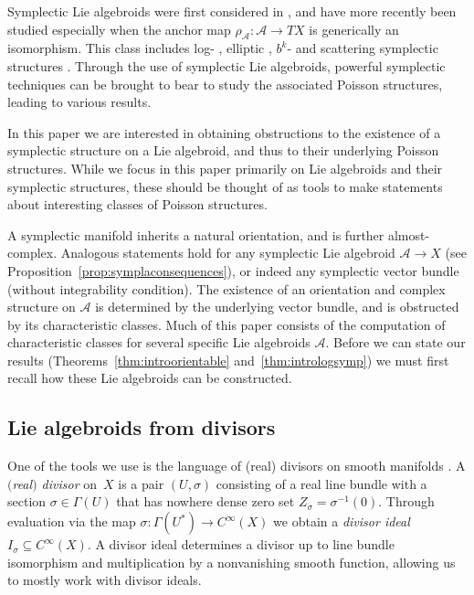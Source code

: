 \documentclass[pdftex]{sigma}
\numberwithin{equation}{section}
\begin{document}
Symplectic Lie algebroids were first considered in \cite{NestTsygan01}, and have more recently been studied especially when the anchor map $\rho_\mathcal{A}\colon \mathcal{A} \to TX$ is generically an isomorphism. This class includes log- \cite{Cavalcanti17,GualtieriLi14,GuilleminMirandaPires14,MarcutOsornoTorres14,MarcutOsornoTorres14two}, elliptic \cite{CavalcantiGualtieri18, CavalcantiKlaasse18}, $b^k$- \cite{GuilleminMirandaWeitsman17, MirandaPlanas18two, MirandaPlanas18, Scott16} and scattering symplectic structures \cite{Lanius16}. Through the use of symplectic Lie algebroids, powerful symplectic techniques can be brought to bear to study the associated Poisson structures, leading to various results.

In this paper we are interested in obtaining obstructions to the existence of a symplectic structure on a Lie algebroid, and thus to their underlying Poisson structures. While we focus in this paper primarily on Lie algebroids and their symplectic structures, these should be thought of as tools to make statements about interesting classes of Poisson structures.

A symplectic manifold inherits a natural orientation, and is further almost-complex. Analogous statements hold for any symplectic Lie algebroid $\mathcal{A} \to X$ (see Proposition~\ref{prop:symplaconsequences}), or indeed any symplectic vector bundle (without integrability condition). The existence of an orientation and complex structure on $\mathcal{A}$ is determined by the underlying vector bundle, and is obstructed by its characteristic classes. Much of this paper consists of the computation of characteristic classes for several specific Lie algebroids $\mathcal{A}$. Before we can state our results (Theorems~\ref{thm:introorientable} and~\ref{thm:intrologsymp}) we must first recall how these Lie algebroids can be constructed.

\subsection{Lie algebroids from divisors}

One of the tools we use is the language of (real) divisors on smooth manifolds \cite{CavalcantiKlaasse18,Klaasse18}. A \emph{$($real$)$ divisor} on~$X$ is a pair $(U,\sigma)$ consisting of a real line bundle with a section $\sigma \in \Gamma(U)$ that has nowhere dense zero set $Z_\sigma = \sigma^{-1}(0)$. Through evaluation via the map $\sigma\colon \Gamma(U^*) \to C^\infty(X)$ we obtain a \emph{divisor ideal} $I_\sigma \subseteq C^\infty(X)$. A divisor ideal determines a divisor up to line bundle isomorphism and multiplication by a nonvanishing smooth function, allowing us to mostly work with divisor ideals.
\end{document}
